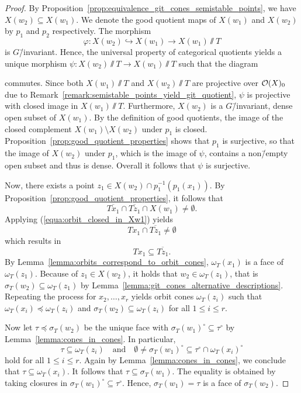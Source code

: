 \begin{proof}
	 By Proposition~\ref{prop:equivalence_git_cones_semistable_points}, we have $X(w_2)\subseteq X(w_1)$. We denote the good quotient maps of $X(w_1)$ and $X(w_2)$ by $p_1$ and $p_2$ respectively. The morphism
	 $$\varphi: X(w_2) \hookrightarrow X(w_1) \rightarrow X(w_1) \sslash T$$
	 is $G$\=/invariant. Hence, the universal property of categorical quotients yields a unique morphism $\psi: X(w_2)\sslash T \rightarrow X(w_1)\sslash T$ such that the diagram
	 \begin{center}
	 \end{center}
	 commutes. Since both $X(w_1) \sslash T$ and $X(w_2) \sslash T$ are projective over $\mathcal{O}(X)_0$ due to Remark~\ref{remark:semistable_points_yield_git_quotient}, $\psi$ is projective with closed image in $X(w_1) \sslash T$. Furthermore, $X(w_2)$ is a $G$\=/invariant, dense open subset of $X(w_1)$. By the definition of good quotients, the image of the closed complement $X(w_1)\setminus X(w_2)$ under $p_1$ is closed. Proposition~\ref{prop:good_quotient_properties} shows that $p_1$ is surjective, so that the image of $X(w_2)$ under $p_1$, which is the image of $\psi$, contains a non\=/empty open subset and thus is dense. Overall it follows that $\psi$ is surjective. 
	 
	 Now, there exists a point $z_1\in X(w_2) \cap p_1^{-1}(p_1(x_1))$. By Proposition~\ref{prop:good_quotient_properties}, it follows that 
	 $$\overline{Tx_1} \cap \overline{Tz_1} \cap X(w_1) \neq \emptyset.$$
	 Applying (\ref{equa:orbit_closed_in_Xw1}) yields
	 $$Tx_1 \cap \overline{Tz_1} \neq \emptyset$$
	 which results in
	 $$Tx_1 \subseteq \overline{Tz_1}.$$
	 By Lemma~\ref{lemma:orbits_correspond_to_orbit_cones}, $\omega_T(x_1)$ is a face of $\omega_T(z_1)$. Because of $z_1\in X(w_2)$, it holds that $w_2\in \omega_T(z_1)$, that is $\sigma_T(w_2) \subseteq \omega_T(z_1)$ by Lemma~\ref{lemma:git_cones_alternative_descriptions}. Repeating the process for $x_2,\dots,x_r$ yields orbit cones $\omega_T(z_i)$ such that $\omega_T(x_i)\preceq \omega_T(z_i)$ and $\sigma_T(w_2) \subseteq \omega_T(z_i)$ for all $1\leq i\leq r$.
	 
	 Now let $\tau\preceq \sigma_T(w_2)$ be the unique face with $\sigma_T(w_1)^\circ \subseteq \tau^\circ$ by Lemma~\ref{lemma:cones_in_cones}. In particular,
	 $$\tau\subseteq\omega_T(z_i)\quad\mathrm{and}\quad\emptyset \neq \sigma_T(w_1)^\circ \subseteq \tau^\circ \cap \omega_T(x_i)^\circ$$
	 hold for all $1\leq i\leq r$. Again by Lemma~\ref{lemma:cones_in_cones}, we conclude that $\tau\subseteq \omega_T(x_i)$. It follows that $\tau \subseteq \sigma_T(w_1)$. The equality is obtained by taking closures in $\sigma_T(w_1)^\circ \subseteq \tau^\circ$. Hence, $\sigma_T(w_1) = \tau$ is a face of $\sigma_T(w_2)$.
\end{proof}

